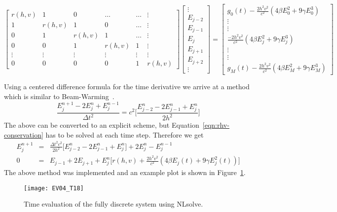\documentclass{article}[12pt]
\theoremstyle{plain}
\begin{document}
\[
\begin{bmatrix}
r(h,v) & 1 & 0 & \ldots & \ldots & \vdots \\
1 & r(h,v) & 1 & 0 & \ldots & \vdots \\
0 & 1 & r(h,v) & 1 & \ldots & \vdots \\
0 & 0 & 1 & r(h,v) & 1 & \vdots \\
\vdots & \vdots & \vdots & \vdots & \vdots & \vdots \\
0 & 0 & 0 & 0 & 1 & r(h,v) 
\end{bmatrix}
\begin{bmatrix}
\vdots \\
E_{j-2} \\
E_{j-1} \\
E_j \\
E_{j+1} \\
E_{j+2} \\
\vdots
\end{bmatrix} = 
\begin{bmatrix}
g_0(t)-\frac{2h^2 v^2}{c^2}( 4\beta E_0^2 + 9\gamma E_0^3) \\
\vdots\\
\vdots\\
\frac{-2h^2 v^2}{c^2}( 4\beta E_j^2 + 9\gamma E_j^3) \\
\vdots\\
\vdots\\
g_M(t)-\frac{2h^2 v^2}{c^2}( 4\beta E_M^2 + 9\gamma E_M^3)
\end{bmatrix}
\]

Using a centered difference formula for the time derivative we arrive at a method which is similar to Beam-Warming~\cite{leveque2007finite}.
\begin{equation}
\frac{E_j^{n+1}-2E_j^n+E_j^{n-1}}{\Delta t^2} = c^2\Big[ \frac{E_{j-2}^n - 2E_{j-1}^n + E_j^n}{2h^2}\Big]
\end{equation}
The above can be converted to an explicit scheme, but Equation~\ref{eqn:rhv-conservation} has to be solved at each time step.
Therefore we get
\begin{eqnarray}
E_j^{n+1} & = & \frac{\Delta t^2 c^2}{2h^2}\Big[ E_{j-2}^n - 2E_{j-1}^n + E_j^n\Big] + 2E_j^n - E_j^{n-1} \nonumber \\
0 & = & E_{j-1}+2E_{j+1}+E_j^n\Big[ r(h,v) + \frac{2h^2 v^2}{c^2}( 4\beta E_j(t) + 9\gamma E_j^2(t))\Big]
\end{eqnarray}
The above method was implemented and an example plot is shown in Figure~\ref{fig:nlsolve}.

\begin{figure}
\begin{center}
\texttt{[image: EV04\_T18]}
\caption{Time evaluation of the fully discrete system using NLsolve.}
\label{fig:nlsolve}
\end{center}
\end{figure}
\end{document}
